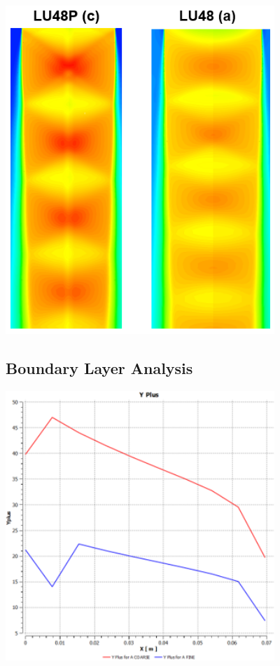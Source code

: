 \documentclass[12pt]{article} %
\begin{document}
\begin{center}
    \includegraphics[width=4in]{VenaContracta_CFD.PNG}
    \label{fig:VenaContractaCFD}
\end{center}

\subsection{Boundary Layer Analysis}
\begin{center}
    \includegraphics[width=4in]{YPlus_A.png}
    \label{fig:YPlusA}
\end{center}
\end{document}
